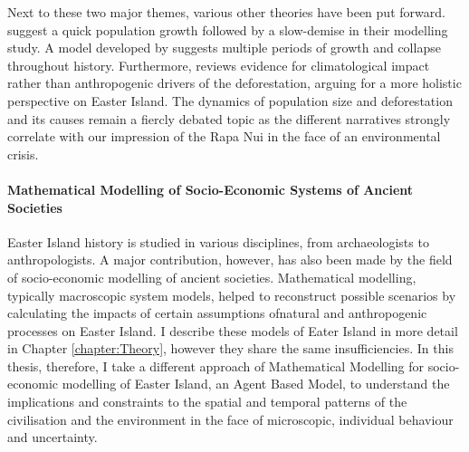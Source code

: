 Next to these two major themes, various other theories have been put forward.
\citet{Brandt2015} suggest a quick population growth followed by a slow-demise in their modelling study.
A model developed by \citet{Cole2008} suggests multiple periods of growth and collapse throughout history. 
Furthermore, \citet{Rull2016} reviews evidence for climatological impact rather than anthropogenic drivers of the deforestation, arguing for a more holistic perspective on Easter Island.
The dynamics of population size and deforestation and its causes remain a fiercly debated topic as the different narratives strongly correlate with our impression of the Rapa Nui in the face of an environmental crisis. 



\paragraph{Mathematical Modelling of Socio-Economic Systems of Ancient Societies}
Easter Island history is studied in various disciplines, from archaeologists to anthropologists. 
A major contribution, however, has also been made by the field of socio-economic modelling of ancient societies.
Mathematical modelling, typically macroscopic system models, helped to reconstruct possible scenarios by calculating the impacts of certain assumptions ofnatural and anthropogenic processes on Easter Island.
I describe these models of Eater Island in more detail in Chapter \ref{chapter:Theory}, however they share the same insufficiencies.
In this thesis, therefore, I take a different approach of Mathematical Modelling for socio-economic modelling of Easter Island, an Agent Based Model, to understand the implications and constraints to the spatial and temporal patterns of the civilisation and the environment in the face of microscopic, individual behaviour and uncertainty.

